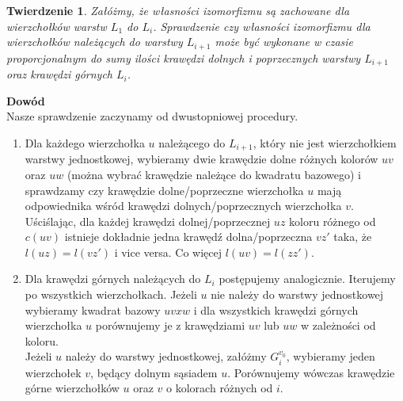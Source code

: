 \documentclass[12pt,a4paper,titlepage]{article}
\newtheorem{twr}{Twierdzenie}
\newcommand\tab[1][1cm]{\hspace*{#1}}
\begin{document}
\begin{twr}Załóżmy, że własności izomorfizmu są zachowane dla wierzchołków warstw $L_1$ do $L_i$. Sprawdzenie czy własności izomorfizmu dla wierzchołków należących do warstwy $L_{i+1}$ może być wykonane w czasie proporcjonalnym do sumy ilości krawędzi dolnych i poprzecznych warstwy $L_{i+1}$ oraz krawędzi górnych $L_{i}$. 
\end{twr}
\tab[-0.6cm]\textbf{Dowód}\\
\tab[0.6cm]Nasze sprawdzenie zaczynamy od dwustopniowej procedury.\\
\begin{enumerate}
\item
Dla każdego wierzchołka $u$ należącego do $L_{i+1}$, który nie jest wierzchołkiem warstwy jednostkowej, wybieramy dwie krawędzie dolne różnych kolorów $uv$ oraz $uw$ (można wybrać krawędzie należące do kwadratu bazowego) i sprawdzamy czy krawędzie dolne/poprzeczne wierzchołka $u$ mają odpowiednika wśród krawędzi dolnych/poprzecznych wierzchołka $v$. Uściślając, dla każdej krawędzi dolnej/poprzecznej $uz$ koloru różnego od $c(uv)$ istnieje dokładnie jedna krawędź dolna/poprzeczna $vz'$ taka, że $l(uz)=l(vz')$ i vice versa. Co więcej $l(uv)=l(zz')$.
\item
Dla krawędzi górnych należących do $L_i$ postępujemy analogicznie. Iterujemy po wszystkich wierzchołkach. Jeżeli $u$ nie należy do warstwy jednostkowej wybieramy kwadrat bazowy $uvxw$ i dla wszystkich krawędzi górnych wierzchołka $u$ porównujemy je z krawędziami $uv$ lub $uw$ w zależności od koloru.\\
Jeżeli $u$ należy do warstwy jednostkowej, załóżmy $G^{v_0}_i$, wybieramy jeden wierzchołek $v$, będący dolnym sąsiadem $u$. Porównujemy wówczas krawędzie górne wierzchołków $u$ oraz $v$ o kolorach różnych od $i$. 
\end{enumerate}
\end{document}
